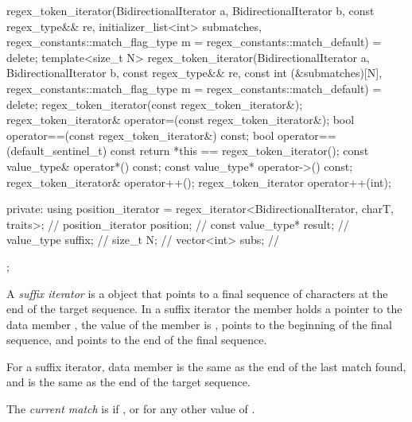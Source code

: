 \begin{codeblock}
{{      regex_token_iterator(BidirectionalIterator a, BidirectionalIterator b,
                           const regex_type&& re,
                           initializer_list<int> submatches,
                           regex_constants::match_flag_type m =
                             regex_constants::match_default) = delete;
      template<size_t N>
      regex_token_iterator(BidirectionalIterator a, BidirectionalIterator b,
                           const regex_type&& re,
                           const int (&submatches)[N],
                           regex_constants::match_flag_type m =
                             regex_constants::match_default) = delete;
      regex_token_iterator(const regex_token_iterator&);
      regex_token_iterator& operator=(const regex_token_iterator&);
      bool operator==(const regex_token_iterator&) const;
      bool operator==(default_sentinel_t) const { return *this == regex_token_iterator(); }
      const value_type& operator*() const;
      const value_type* operator->() const;
      regex_token_iterator& operator++();
      regex_token_iterator operator++(int);

    private:
      using position_iterator =
        regex_iterator<BidirectionalIterator, charT, traits>;   // \expos
      position_iterator position;                               // \expos
      const value_type* result;                                 // \expos
      value_type suffix;                                        // \expos
      size_t N;                                                 // \expos
      vector<int> subs;                                         // \expos
    };
}
\end{codeblock}

\pnum
A \textit{suffix iterator} is a  object
that points to a final sequence of characters at
the end of the target sequence. In a suffix iterator the
member  holds a pointer to the data
member , the value of the member 
is ,  points to the beginning of the
final sequence, and  points to the end of the
final sequence.

\pnum
\begin{note}
For a suffix iterator, data
member  is the same as the end of the last match
found, and  is the same as the end of the target
sequence.
\end{note}

\pnum
The \textit{current match} is  if , or
 for any other value of .

